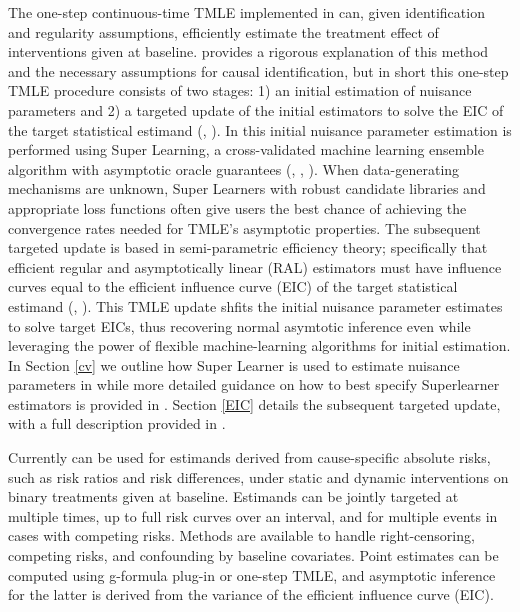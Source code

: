 \documentclass{report}
\newcommand{\1}{\ensuremath{\mathbf{1}}}
\begin{document}
The one-step continuous-time TMLE implemented in  can, given identification and regularity assumptions, efficiently estimate the treatment effect of interventions given at baseline. \cite{rytgaard_one-step_2021} provides a rigorous explanation of this method and the necessary assumptions for causal identification, but in short this one-step TMLE procedure consists of two stages: 1) an initial estimation of nuisance parameters and 2) a targeted update of the initial estimators to solve the EIC of the target statistical estimand (\cite{laan_unified_2003-1}, \cite{kennedy_semiparametric_2016}). In  this initial nuisance parameter estimation is performed using Super Learning, a cross-validated machine learning ensemble algorithm with asymptotic oracle guarantees (\cite{laan_unified_2003}, \cite{laan_super_2007}, \cite{polley_superlearner_2021}). When data-generating mechanisms are unknown, Super Learners with robust candidate libraries and appropriate loss functions often give users the best chance of achieving the convergence rates needed for TMLE's asymptotic properties. The subsequent targeted update is based in semi-parametric efficiency theory; specifically that efficient regular and asymptotically linear (RAL) estimators must have influence curves equal to the efficient influence curve (EIC) of the target statistical estimand (\cite{laan_targeted_2011}, \cite{kennedy_semiparametric_2016}). This TMLE update shfits the initial nuisance parameter estimates to solve target EICs, thus recovering normal asymtotic inference even while leveraging the power of flexible machine-learning algorithms for initial estimation. In Section \ref{cv} we outline how Super Learner is used to estimate nuisance parameters in  while more detailed guidance on how to best specify Superlearner estimators is provided in \cite{phillips_practical_2022}. Section \ref{EIC} details the subsequent targeted update, with a full description provided in \cite{rytgaard_one-step_2021}. 

Currently  can be used for estimands derived from cause-specific absolute risks, such as risk ratios and risk differences, under static and dynamic interventions on binary treatments given at baseline. Estimands can be jointly targeted at multiple times, up to full risk curves over an interval, and for multiple events in cases with competing risks. Methods are available to handle right-censoring, competing risks, and confounding by baseline covariates. Point estimates can be computed using g-formula plug-in or one-step TMLE, and asymptotic inference for the latter is derived from the variance of the efficient influence curve (EIC). 
\end{document}
